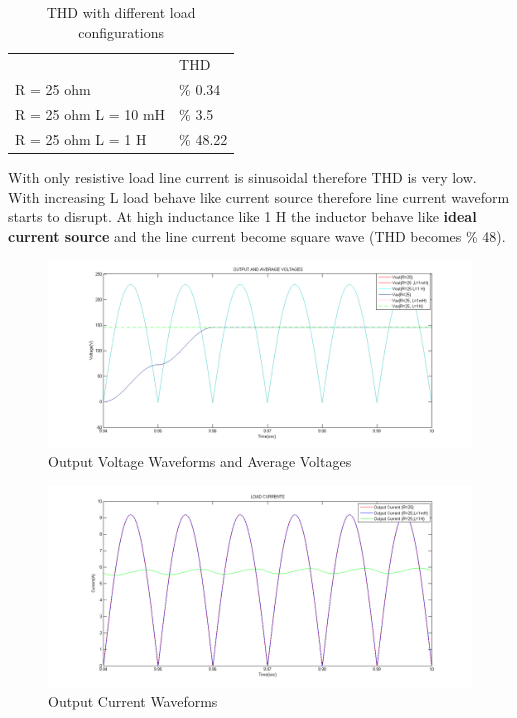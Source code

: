 \documentclass[fleqn, a4paper]{article}
\begin{document}
\begin{table}[H]
\centering
\begin{tabular}{ll}
                      & THD      \\
R = 25 ohm            & \% 0.34  \\
R = 25 ohm L  = 10 mH & \% 3.5   \\
R = 25 ohm L = 1 H    & \% 48.22
\end{tabular}
\caption{THD with different load configurations}
\end{table} 

With only resistive load line current is sinusoidal therefore THD is very low. With increasing L load behave like current source therefore line current waveform starts to disrupt. At high inductance like 1 H the inductor behave like \textbf{ideal current source} and the line current become square wave (THD becomes \% 48). 


\begin{figure}[H]
  \includegraphics[width=\linewidth]{Q2_1.png}
  \caption{Output Voltage Waveforms and Average Voltages}
  \label{fig:simulink2}
\end{figure}



\begin{figure}[H]
  \includegraphics[width=\linewidth]{Q2_2.png}
  \caption{Output Current Waveforms}
  \label{fig:simulink2}
\end{figure}
\end{document}
